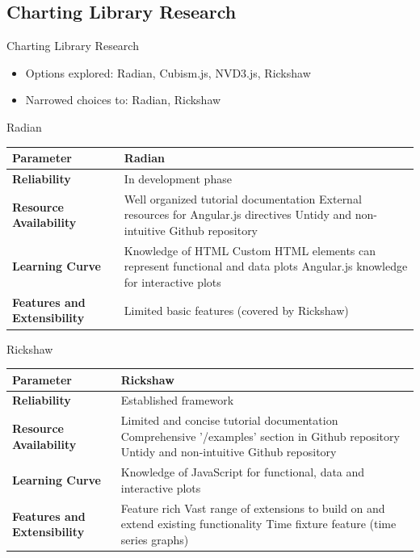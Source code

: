 \documentclass{beamer}
\begin{document}
\subsection{Charting Library Research}
\begin{frame}{Charting Library Research}
	\begin{itemize}
		\item Options explored: Radian, Cubism.js, NVD3.js, Rickshaw
		\item Narrowed choices to: Radian, Rickshaw
	\end{itemize}
\end{frame}

\begin{frame}{Radian}
\begin{tabular}{| p{2.5cm} | p{8cm} |}
    \hline
     \textbf{Parameter} & \textbf{Radian} \\ \hline
  \textbf{Reliability} \newline & In development phase \\ \hline
  \textbf{Resource \newline Availability} &  Well organized tutorial documentation
		\newline External resources for Angular.js directives 
		\newline Untidy and non-intuitive Github repository \\ \hline
  \textbf{Learning Curve} &  Knowledge of HTML
		\newline Custom HTML elements can represent functional and data plots
		\newline Angular.js knowledge for interactive plots \\ \hline
\textbf{Features and Extensibility}& Limited basic features (covered by Rickshaw) \\ \hline
\end{tabular}
\end{frame}

\begin{frame}{Rickshaw}
\begin{tabular}{| p{2.5cm} | p{8cm} |}
    \hline
     \textbf{Parameter} & \textbf{Rickshaw} \\ \hline
\textbf{Reliability}\newline & Established framework  \\ \hline
\textbf{Resource \newline Availability} &  Limited and concise tutorial documentation
		\newline Comprehensive '/examples' section in Github repository
		\newline Untidy and non-intuitive Github repository \\ \hline
\textbf{Learning Curve}  &  Knowledge of JavaScript for functional, data and interactive plots \\ \hline
\textbf{Features and Extensibility} & Feature rich
		\newline Vast range of extensions to build on and extend existing functionality
		\newline *Time fixture feature (time series graphs)\\ \hline
\end{tabular}
\end{frame}
\end{document}
